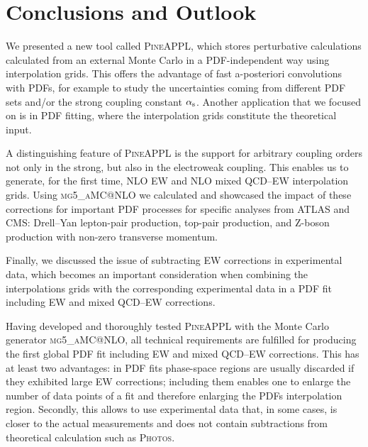 \section{Conclusions and Outlook}
\label{sec:conclusion}

We presented a new tool called \textsc{PineAPPL}, which stores perturbative calculations calculated from an external Monte Carlo in a PDF-independent way using interpolation grids.
This offers the advantage of fast a-posteriori convolutions with PDFs, for example to study the uncertainties coming from different PDF sets and/or the strong coupling constant $\alpha_\mathrm{s}$.
Another application that we focused on is in PDF fitting, where the interpolation grids constitute the theoretical input.

A distinguishing feature of \textsc{PineAPPL} is the support for arbitrary coupling orders not only in the strong, but also in the electroweak coupling.
This enables us to generate, for the first time, NLO EW and NLO mixed QCD--EW interpolation grids.
Using \textsc{mg5\_aMC@NLO} we calculated and showcased the impact of these corrections for important PDF processes for specific analyses from ATLAS and CMS: Drell--Yan lepton-pair production, top-pair production, and Z-boson production with non-zero transverse momentum.

Finally, we discussed the issue of subtracting EW corrections in experimental data, which becomes an important consideration when combining the interpolations grids with the corresponding experimental data in a PDF fit including EW and mixed QCD--EW corrections.

Having developed and thoroughly tested \textsc{PineAPPL} with the Monte Carlo generator \textsc{mg5\_aMC@NLO}, all technical requirements are fulfilled for producing the first global PDF fit including EW and mixed QCD--EW corrections.
This has at least two advantages: in PDF fits phase-space regions are usually discarded if they exhibited large EW corrections; including them enables one to enlarge the number of data points of a fit and therefore enlarging the PDFs interpolation region.
Secondly, this allows to use experimental data that, in some cases, is closer to the actual measurements and does not contain subtractions from theoretical calculation such as \textsc{Photos}.
